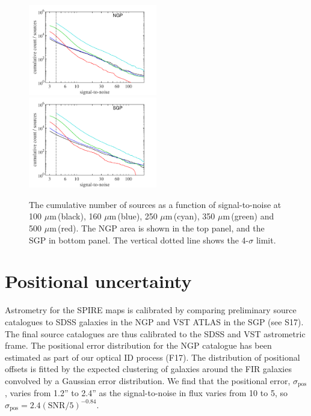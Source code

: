 \documentclass[useAMS,usenatbib]{mn2e}
\def\mic{ $\mu $m\,}
\begin{document}
\begin{figure}
\includegraphics[width=0.5\textwidth]{cum_sn_NGP.pdf}
\includegraphics[width=0.5\textwidth]{cum_sn_SGP.pdf}
 \caption{\protect\label{fig_sn} The cumulative number of sources as a function
   of signal-to-noise at 100\mic (black), 160\mic (blue), 250\mic (cyan),
  350\mic (green) and 500\mic (red). The NGP area is shown in the top panel,
  and the SGP in bottom panel. The vertical dotted line shows the
  4-$\sigma$ limit. 
} 
\end{figure}

\section{Positional uncertainty} 

Astrometry for the SPIRE maps is calibrated by comparing preliminary
source catalogues to SDSS galaxies in the NGP and VST ATLAS in the SGP
(see S17). The final source catalogues are thus calibrated to the SDSS
and VST astrometric frame. The positional error distribution for the
NGP catalogue has been estimated as part of our optical ID process
(F17). The distribution of positional offsets is fitted by the
expected clustering of galaxies around the FIR galaxies convolved by a
Gaussian error distribution. We find that the positional error,
$\sigma_\mathrm{pos}$, varies from 1.2'' to 2.4'' as the
signal-to-noise in flux varies from 10 to 5, so $\sigma_\mathrm{pos} =
2.4 (\mathrm{SNR}/5)^{-0.84}$.
\end{document}

